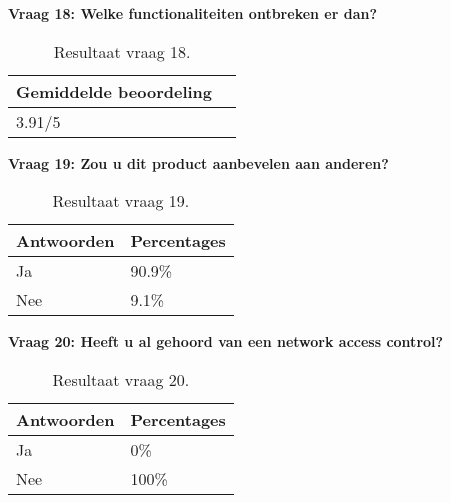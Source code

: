 \textbf{Vraag 18: Welke functionaliteiten ontbreken er dan?}
\begin{table}[H]
	\begin{center}
		\begin{tabular}{|l|l|}
			\hline
			\bf Gemiddelde beoordeling                                                                        \\ \hline
			3.91/5 \\ \hline                                                   
		\end{tabular}
		\caption{Resultaat vraag 18.}
	\end{center}
\end{table}

\textbf{Vraag 19: Zou u dit product aanbevelen aan anderen?}

\begin{table}[h!]
	\begin{center}
		\begin{tabular}{|l|l|}
					\hline
			\bf Antwoorden    & \bf Percentages \\ \hline
			Ja      & 90.9\% \\ \hline
			Nee     & 9.1\%    \\ \hline                                                                                                                           
		\end{tabular}
		\caption{Resultaat vraag 19.}
	\end{center}
\end{table}

\textbf{Vraag 20: Heeft u al gehoord van een network access control?}

\begin{table}[h!]
	\begin{center}
		\begin{tabular}{|l|l|}
		\hline
		\bf Antwoorden    & \bf Percentages \\ \hline
		Ja      & 0\% \\ \hline
		Nee     & 100\%    \\ \hline                                                      
		\end{tabular}
		\caption{Resultaat vraag 20.}
	\end{center}
\end{table}

